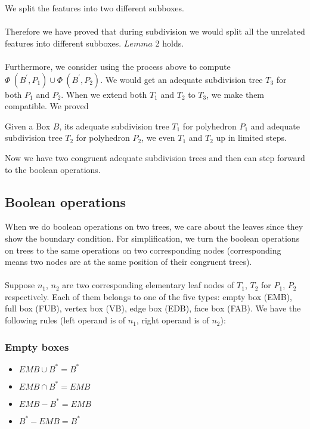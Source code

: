 \documentclass[twoside]{article}
\begin{document}
\begin{multicols}{2}
\indent We split the features into two different subboxes.
 \fi
 \\
 \\
\indent Therefore we have proved that during subdivision we would split all the unrelated features into different subboxes. $Lemma$ 2 holds.
\\
\\
\indent Furthermore, we consider using the process above to compute $\Phi\ (B^\prime, P_1) \cup \Phi\ (B^\prime, P_2)$. We would get an adequate subdivision tree $T_3$ for both $P_1$ and $P_2$. When we extend both $T_1$ and $T_2$ to $T_3$, we make them compatible. We proved

\begin{lemma}
Given a Box $B$, its adequate subdivision tree $T_1$ for polyhedron $P_1$ and adequate subdivision tree $T_2$ for polyhedron $P_2$, we even $T_1$ and $T_2$ up in limited steps.
\end{lemma}
\indent Now we have two congruent adequate subdivision trees and then can step forward to the boolean operations.
\subsection {Boolean operations}
When we do boolean operations on two trees, we care about the leaves since they show the boundary condition. For simplification, we turn the boolean operations on trees to the same operations on two corresponding nodes (corresponding means two nodes are at the same position of their congruent trees).
\\
\\
\indent
Suppose $n_1$, $n_2$ are two corresponding elementary leaf nodes of $T_1$, $T_2$ for $P_1$, $P_2$ respectively. Each of them belongs to one of the five types: empty box (EMB), full box (FUB), vertex box (VB), edge box (EDB), face box (FAB). We have the following rules (left operand is of $n_1$, right operand is of $n_2$):

\subsubsection{Empty boxes}
\begin{itemize}
\item $EMB \cup B^* = B^*$
\item $EMB \cap B^* = EMB$
\item $EMB - B^* = EMB$
\item $B^* - EMB = B^*$
\end{itemize}


\end{multicols}
\end{document}
